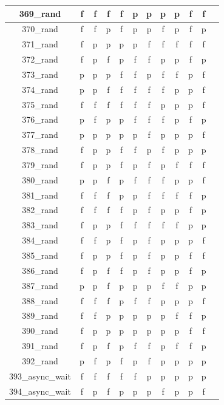 \documentclass[
fancyheadings, %
%
%
]{stsreprt}
\begin{document}
\begin{longtable}{|c|c|c|c|c|c|c|c|c|c|c|c|}
\hline
369\_rand & f & f & f & f & p & p & p & p & f & f \\
\hline
370\_rand & f & f & p & f & p & p & f & p & f & p \\
\hline
371\_rand & f & p & p & p & p & f & f & f & f & f \\
\hline
372\_rand & f & p & f & p & f & f & p & p & f & p \\
\hline
373\_rand & p & p & p & f & f & p & f & f & p & f \\
\hline
374\_rand & p & p & f & f & f & f & f & p & p & f \\
\hline
375\_rand & f & f & f & f & f & f & p & p & p & f \\
\hline
376\_rand & p & f & p & p & f & f & f & p & f & p \\
\hline
377\_rand & p & p & p & p & p & f & p & p & p & f \\
\hline
378\_rand & f & p & p & f & f & p & f & p & p & p \\
\hline
379\_rand & f & p & p & f & p & f & p & f & f & f \\
\hline
380\_rand & p & p & f & p & f & f & f & p & p & f \\
\hline
381\_rand & f & f & f & p & p & f & f & f & f & p \\
\hline
382\_rand & f & f & f & f & p & f & p & p & f & p \\
\hline
383\_rand & f & p & p & f & f & f & f & f & p & p \\
\hline
384\_rand & f & f & p & f & p & f & p & p & p & f \\
\hline
385\_rand & f & p & p & f & p & f & p & p & f & f \\
\hline
386\_rand & f & p & f & f & p & f & p & p & f & p \\
\hline
387\_rand & p & p & f & p & p & p & f & f & p & p \\
\hline
388\_rand & f & f & f & p & f & f & p & p & p & f \\
\hline
389\_rand & f & f & p & p & p & p & p & f & f & p \\
\hline
390\_rand & f & p & p & p & p & p & p & p & f & f \\
\hline
391\_rand & f & p & f & p & f & f & p & f & f & p \\
\hline
392\_rand & p & f & p & f & p & f & p & p & p & p \\
\hline
393\_async\_wait & f & f & f & f & f & p & p & p & p & p \\
\hline
394\_async\_wait & f & p & f & p & p & p & f & p & p & f \\

\end{longtable}
\end{document}
